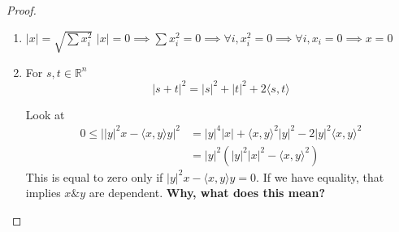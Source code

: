 \documentclass[a4paper]{article}
\numberwithin{equation}{section}
\begin{document}
\begin{proof}
    \begin{enumerate}
        \item $|x|=\sqrt{\sum x_i^2}$
        $|x|=0\implies\sum x_i^2=0\implies\forall i, x_i^2=0\implies \forall i,x_i=0\implies x=0$
        \item 
        For $s,t\in\mathbb R^n$
        \begin{equation}
            |s+t|^2=|s|^2+|t|^2+2\langle s,t \rangle
        \end{equation}

        Look at 
        \begin{align}
            0\leq\Big||y|^2x-\langle x,y\rangle y\Big|^2&=|y|^4|x|+\langle x,y\rangle^2|y|^2-2|y|^2\langle x,y\rangle^2\\
            &=|y|^2\left(|y|^2|x|^2-\langle x,y \rangle^2\right)
        \end{align}
        This is equal to zero only if $|y|^2x-\langle x,y\rangle y=0$. If we have equality, that implies $x\&y$ are dependent.
        \textbf{Why, what does this mean?}

    \end{enumerate}
\end{proof}
\end{document}
